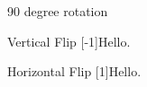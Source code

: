 \documentclass[]{article}
\begin{document}
90 degree rotation 

Vertical Flip \scalebox{1}[-1]{Hello.}

Horizontal Flip \scalebox{-1}[1]{Hello.}
\end{document}

